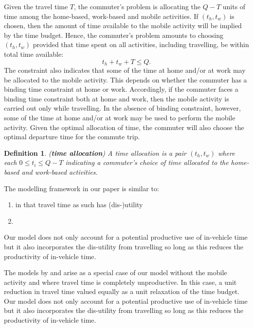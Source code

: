 \documentclass[12pt,a4paper,british]{article}
\newtheorem{definition}{Definition}[section]
\begin{document}
Given the travel time $T$, the commuter's problem is allocating the $Q-T$ units of time among the home-based, work-based and mobile activities. If $\left(t_{h},t_{w}\right)$ is chosen, then the amount of time available to the mobile activity will be implied by the time budget. Hence, the commuter's problem amounts to choosing $\left(t_{h},t_{w}\right)$ provided that time spent on all activities, including travelling, be within total time available:  
\begin{equation}
t_{h}+t_{w}+T\leq Q.
\label{constraint0}
\end{equation}
The constraint also indicates that some of the time at home and/or at work may be allocated to the mobile activity. This depends on whether the commuter has a binding time constraint at home or work. Accordingly, if the commuter faces a binding time constraint both at home and work, then the mobile activity is carried out only while travelling. In the absence of binding constraint, however, some of the time at home and/or at work may be used to perform the mobile activity. Given the optimal allocation of time, the commuter will also choose the optimal departure time for the commute trip.


\begin{definition}
(\textbf{time allocation}) A time allocation is a pair $\left(t_{h},t_{w}\right)$ where each $0\leq t_{i}\leq Q-T$ indicating a commuter's choice of time allocated to the home-based and work-based activities.
\end{definition}

The modelling framework in our paper is similar to:
\begin{enumerate}
    \item \citeauthor{Oort1969EvaluationTravellingTime} in that travel time as such has (dis-)utility
    \item \citet{DeSerpa1971TheoryEconomicsTime}
\end{enumerate}

Our model does not only account for a potential productive use of in-vehicle time but it also incorporates the dis-utility from travelling so long as this reduces the productivity of in-vehicle time.

The models by \citeauthor{Becker1965TheoryAllocationTime} and \citeauthor{Johnson1966TravelTimePrice} arise as a special case of our model without the mobile activity and where travel time is completely unproductive. In this case, a unit reduction in travel time valued equally as a unit relaxation of the time budget. 
Our model does not only account for a potential productive use of in-vehicle time but it also incorporates the dis-utility from travelling so long as this reduces the productivity of in-vehicle time.
\end{document}
